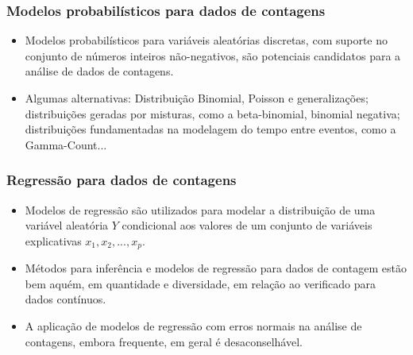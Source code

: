 \documentclass[10pt, aspectratio=169]{beamer}
\begin{document}


\begin{frame}\frametitle{Modelos probabilísticos para dados de contagens}

\begin{itemize}
    \item Modelos probabilísticos para variáveis aleatórias discretas, com suporte no conjunto de números inteiros não-negativos, são potenciais candidatos para a análise de dados de contagens.
    
\vspace{0.5cm}    
    
    \item Algumas alternativas: Distribuição Binomial, Poisson e generalizações; distribuições geradas por misturas, como a beta-binomial, binomial negativa; distribuições fundamentadas na modelagem do tempo entre eventos, como a Gamma-Count...
    
   
\end{itemize}
\end{frame}



\begin{frame}\frametitle{Regressão para dados de contagens}

\begin{itemize}

\item Modelos de regressão são utilizados para modelar a distribuição de uma variável aleatória $Y$ condicional aos valores de um conjunto de variáveis explicativas $x_{1},x_{2},...,x_{p}$.

\vspace{0,5cm}

\item Métodos para inferência e modelos de regressão para dados de contagem estão bem
aquém, em quantidade e diversidade, em relação ao verificado para dados contínuos.

\vspace{0,5cm}

\item A aplicação de modelos de regressão com erros normais na análise de contagens, embora frequente, em geral é desaconselhável.

\end{itemize}
\end{frame}
\end{document}
